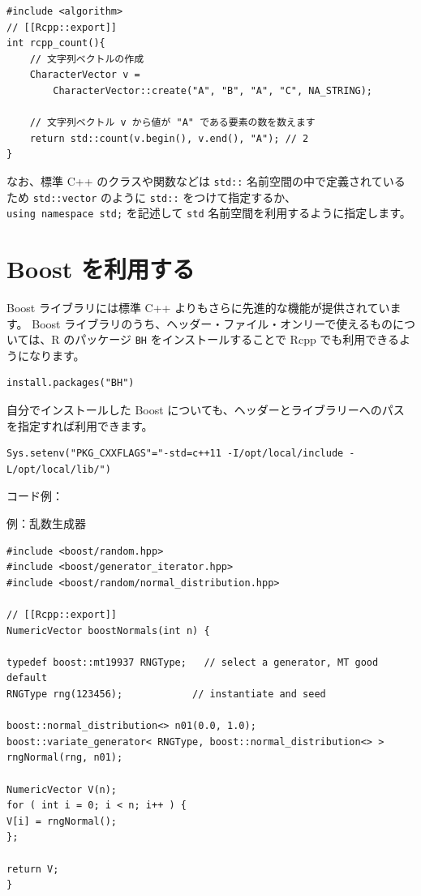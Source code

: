 \documentclass[]{book}
\begin{document}
\begin{verbatim}
#include <algorithm>
// [[Rcpp::export]]
int rcpp_count(){
    // 文字列ベクトルの作成
    CharacterVector v =
        CharacterVector::create("A", "B", "A", "C", NA_STRING);

    // 文字列ベクトル v から値が "A" である要素の数を数えます
    return std::count(v.begin(), v.end(), "A"); // 2
}
\end{verbatim}

なお、標準 C++ のクラスや関数などは \texttt{std::} 名前空間の中で定義されているため \texttt{std::vector} のように \texttt{std::} をつけて指定するか、 \texttt{using\ namespace\ std;} を記述して \texttt{std} 名前空間を利用するように指定します。

\hypertarget{boost-}{%
\chapter{Boost を利用する}\label{boost-}}

Boost ライブラリには標準 C++ よりもさらに先進的な機能が提供されています。
Boost ライブラリのうち、ヘッダー・ファイル・オンリーで使えるものについては、R のパッケージ \texttt{BH} をインストールすることで Rcpp でも利用できるようになります。

\begin{verbatim}
install.packages("BH")
\end{verbatim}

自分でインストールした Boost についても、ヘッダーとライブラリーへのパスを指定すれば利用できます。

\begin{verbatim}
Sys.setenv("PKG_CXXFLAGS"="-std=c++11 -I/opt/local/include -L/opt/local/lib/")
\end{verbatim}

コード例：

例：乱数生成器

\begin{verbatim}
#include <boost/random.hpp>
#include <boost/generator_iterator.hpp>
#include <boost/random/normal_distribution.hpp>

// [[Rcpp::export]]
NumericVector boostNormals(int n) {

typedef boost::mt19937 RNGType;   // select a generator, MT good default
RNGType rng(123456);            // instantiate and seed

boost::normal_distribution<> n01(0.0, 1.0);
boost::variate_generator< RNGType, boost::normal_distribution<> > rngNormal(rng, n01);

NumericVector V(n);
for ( int i = 0; i < n; i++ ) {
V[i] = rngNormal();
};

return V;
}
\end{verbatim}
\end{document}
